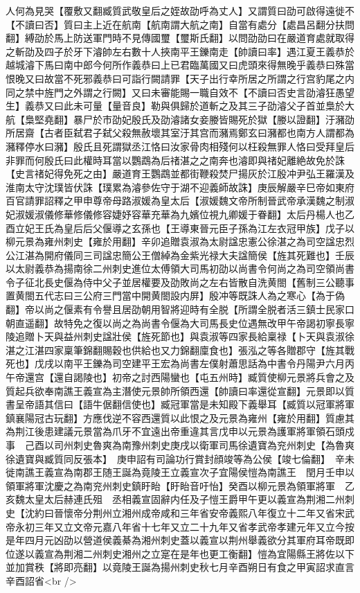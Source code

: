 人何為見哭【覆敷又翻臧質武敬皇后之姪故劭呼為丈人】又謂質曰劭可啟得遠徙不【不讀曰否】質曰主上近在航南【航南謂大航之南】自當有處分【處昌呂翻分扶問翻】縛劭於馬上防送軍門時不見傳國璽【璽斯氏翻】以問劭劭曰在嚴道育處就取得之斬劭及四子於牙下濬帥左右數十人挾南平王鑠南走【帥讀曰率】遇江夏王義恭於越城濬下馬曰南中郎今何所作義恭曰上已君臨萬國又曰虎頭來得無晚乎義恭曰殊當恨晚又曰故當不死邪義恭曰可詣行闕請罪【天子出行幸所居之所謂之行宫豹尾之内同之禁中旌門之外謂之行闕】又曰未審能賜一職自效不【不讀曰否史言劭濬狂愚望生】義恭又曰此未可量【量音良】勒與俱歸於道斬之及其三子劭濬父子首並梟於大航【梟堅堯翻】暴尸於市劭妃殷氏及劭濬諸女妾媵皆賜死於獄【媵以證翻】汙瀦劭所居齋【古者臣弑君子弑父殺無赦壞其室汙其宫而瀦焉鄭玄曰瀦都也南方人謂都為瀦釋停水曰瀦】殷氏且死謂獄丞江恪曰汝家骨肉相殘何以枉殺無罪人恪曰受拜皇后非罪而何殷氏曰此權時耳當以鸚鵡為后禇湛之之南奔也濬即與禇妃離絶故免於誅【史言禇妃得免死之由】嚴道育王鸚鵡並都街鞭殺焚尸揚灰於江殷冲尹弘王羅漢及淮南太守沈璞皆伏誅【璞累為濬參佐守于湖不迎義師故誅】庚辰解嚴辛巳帝如東府百官請罪詔釋之甲申尊帝母路淑媛為皇太后【淑媛魏文帝所制晉武帝承漢魏之制淑妃淑媛淑儀修華修儀修容婕妤容華充華為九嬪位視九卿媛于眷翻】太后丹楊人也乙酉立妃王氏為皇后后父偃導之玄孫也【王導東晉元臣子孫為江左衣冠甲族】戊子以柳元景為雍州刺史【雍於用翻】辛卯追贈袁淑為太尉諡忠憲公徐湛之為司空諡忠烈公江湛為開府儀同三司諡忠簡公王僧綽為金紫光禄大夫諡簡侯【旌其死難也】壬辰以太尉義恭為揚南徐二州刺史進位太傅領大司馬初劭以尚書令何尚之為司空領尚書令子征北長史偃為侍中父子並居權要及劭敗尚之左右皆散自洗黄閤【舊制三公聽事置黄閤五代志曰三公府三門當中開黄閤設内屏】殷冲等既誅人為之寒心【為于偽翻】帝以尚之偃素有令譽且居劭朝用智將迎時有全脱【所謂全脱者活三鎮士民家口朝直遥翻】故特免之復以尚之為尚書令偃為大司馬長史位遇無改甲午帝謁初寧長寧陵追贈卜天與益州刺史諡壯侯【旌死節也】與袁淑等四家長給稟禄【卜天與袁淑徐湛之江湛四家稟筆錦翻賜穀也供給也又力錦翻廩食也】張泓之等各贈郡守【旌其戰死也】戊戌以南平王鑠為司空建平王宏為尚書左僕射蕭思話為中書令丹陽尹六月丙午帝還宫【還自謁陵也】初帝之討西陽蠻也【屯五州時】臧質使柳元景將兵會之及質起兵欲奉南譙王義宣為主潛使元景帥所領西還【帥讀曰率還從宣翻】元景即以質書呈帝語其信曰【語牛倨翻信使也】臧冠軍當是未知殿下義舉耳【臧質以冠軍將軍鎮襄陽冠古玩翻】方應伐逆不容西還質以此恨之及元景為雍州【雍於用翻】質慮其為荆江後患建議元景當為爪牙不宜遠出帝重違其言戊申以元景為護軍將軍領石頭戍事　己酉以司州刺史魯爽為南豫州刺史庚戌以衛軍司馬徐遺寶為兖州刺史【為魯爽徐遺寶與臧質同反張本】　庚申詔有司論功行賞封顔竣等為公侯【竣七倫翻】　辛未徙南譙王義宣為南郡王随王誕為竟陵王立義宣次子宜陽侯愷為南譙王　閏月壬申以領軍將軍沈慶之為南兖州刺史鎮盱眙【盱眙音吁怡】癸酉以柳元景為領軍將軍　乙亥魏太皇太后赫連氏殂　丞相義宣固辭内任及子愷王爵甲午更以義宣為荆湘二州刺史【沈約曰晉懷帝分荆州立湘州成帝咸和三年省安帝義熙八年復立十二年又省宋武帝永初三年又立文帝元嘉八年省十七年又立二十九年又省孝武帝孝建元年又立今按是年四月元凶劭以營道侯義綦為湘州刺史蓋以義宣以荆州舉義欲分其軍府耳帝既即位遂以義宣為荆湘二州刺史湘州之立寔在是年也更工衡翻】愷為宜陽縣王將佐以下並加賞秩【將即亮翻】以竟陵王誕為揚州刺史秋七月辛酉朔日有食之甲寅詔求直言辛酉詔省<br />
